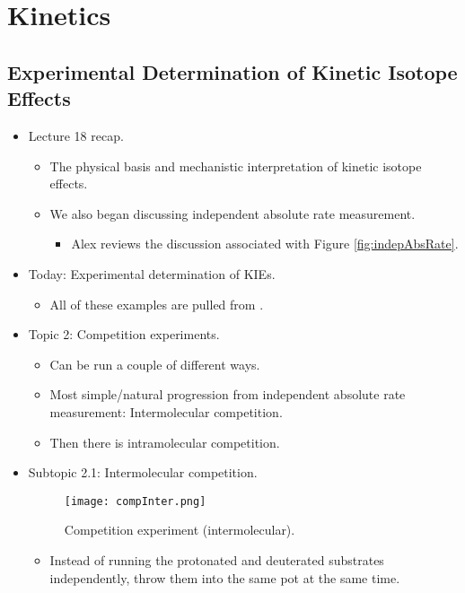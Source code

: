 \documentclass[../notes.tex]{subfiles}
\begin{document}
\chapter{Kinetics}
\section{Experimental Determination of Kinetic Isotope Effects}
\begin{itemize}
    \item {}Lecture 18 recap.
    \begin{itemize}
        \item The physical basis and mechanistic interpretation of kinetic isotope effects.
        \item We also began discussing independent absolute rate measurement.
        \begin{itemize}
            \item Alex reviews the discussion associated with Figure \ref{fig:indepAbsRate}.
        \end{itemize}
    \end{itemize}
    \item Today: Experimental determination of KIEs.
    \begin{itemize}
        \item All of these examples are pulled from \textcite{bib:KIEexpt}.
    \end{itemize}
    \item Topic 2: Competition experiments.
    \begin{itemize}
        \item Can be run a couple of different ways.
        \item Most simple/natural progression from independent absolute rate measurement: Intermolecular competition.
        \item Then there is intramolecular competition.
    \end{itemize}
    \item Subtopic 2.1{}: Intermolecular competition.
    \begin{figure}[h!]
        \centering
        \texttt{[image: compInter.png]}
        \caption{Competition experiment (intermolecular).}
        \label{fig:compInter}
    \end{figure}
    \begin{itemize}
        \item Instead of running the protonated and deuterated substrates independently, throw them into the same pot at the same time.

\end{itemize}
\end{itemize}
\end{document}
